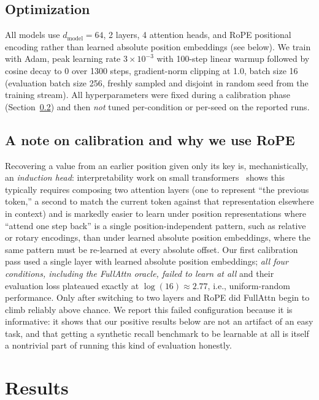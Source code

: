 \documentclass[11pt]{article}
\begin{document}
\subsection{Optimization}
All models use $d_{\text{model}}{=}64$, 2 layers, 4 attention heads, and RoPE positional
encoding rather than learned absolute position embeddings (see below). We train with Adam,
peak learning rate $3\times10^{-3}$ with 100-step linear warmup followed by cosine decay to
0 over 1300 steps, gradient-norm clipping at 1.0, batch size 16 (evaluation batch size 256,
freshly sampled and disjoint in random seed from the training stream). All hyperparameters were
fixed during a calibration phase (Section~\ref{sec:calibration}) and then \emph{not} tuned
per-condition or per-seed on the reported runs.

\subsection{A note on calibration and why we use RoPE}
\label{sec:calibration}
Recovering a value from an earlier position given only its key is, mechanistically, an
\emph{induction head}: interpretability work on small transformers~\citep{olsson2022induction}
shows this typically requires composing two attention layers (one to represent ``the previous
token,'' a second to match the current token against that representation elsewhere in context)
and is markedly easier to learn under position representations where ``attend one step back'' is
a single position-independent pattern, such as relative or rotary encodings, than under learned
absolute position embeddings, where the same pattern must be re-learned at every absolute
offset. Our first calibration pass used a single layer with learned absolute position
embeddings; \emph{all four conditions, including the FullAttn oracle, failed to learn at all}
and their evaluation loss plateaued exactly at $\log(16) \approx 2.77$, i.e., uniform-random
performance. Only after switching to two layers and RoPE did FullAttn begin to climb reliably
above chance. We report this failed configuration because it is informative: it shows that our
positive results below are not an artifact of an easy task, and that getting a synthetic
recall benchmark to be learnable at all is itself a nontrivial part of running this kind of
evaluation honestly.

\section{Results}
\label{sec:results}
\end{document}
